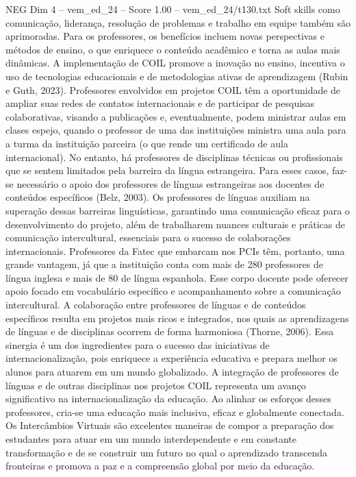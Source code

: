 \begin{textsample}{NEG Dim 4 – vem\_ed\_24 – Score 1.00 – vem\_ed\_24/t130.txt}
Soft skills como comunicação, liderança, resolução de problemas e trabalho em equipe também são aprimoradas.
Para os professores, os benefícios incluem novas perspectivas e métodos de ensino, o que enriquece o conteúdo acadêmico e torna as aulas mais dinâmicas.
A implementação de COIL promove a inovação no ensino, incentiva o uso de tecnologias educacionais e de metodologias ativas de aprendizagem (Rubin e Guth, 2023).
Professores envolvidos em projetos COIL têm a oportunidade de ampliar suas redes de contatos internacionais e de participar de pesquisas colaborativas, visando a publicações e, eventualmente, podem ministrar aulas em clases espejo, quando o professor de uma das instituições ministra uma aula para a turma da instituição parceira (o que rende um certificado de aula internacional).
No entanto, há professores de disciplinas técnicas ou profissionais que se sentem limitados pela barreira da língua estrangeira.
Para esses casos, faz-se necessário o apoio dos professores de línguas estrangeiras aos docentes de conteúdos específicos (Belz, 2003).
Os professores de línguas auxiliam na superação dessas barreiras linguísticas, garantindo uma comunicação eficaz para o desenvolvimento do projeto, além de trabalharem nuances culturais e práticas de comunicação intercultural, essenciais para o sucesso de colaborações internacionais.
Professores da Fatec que embarcam nos PCIs têm, portanto, uma grande vantagem, já que a instituição conta com mais de 280 professores de língua inglesa e mais de 80 de língua espanhola.
Esse corpo docente pode oferecer apoio focado em vocabulário específico e acompanhamento sobre a comunicação intercultural.
A colaboração entre professores de línguas e de conteúdos específicos resulta em projetos mais ricos e integrados, nos quais as aprendizagens de línguas e de disciplinas ocorrem de forma harmoniosa (Thorne, 2006).
Essa sinergia é um dos ingredientes para o sucesso das iniciativas de internacionalização, pois enriquece a experiência educativa e prepara melhor os alunos para atuarem em um mundo globalizado.
A integração de professores de línguas e de outras disciplinas nos projetos COIL representa um avanço significativo na internacionalização da educação.
Ao alinhar os esforços desses professores, cria-se uma educação mais inclusiva, eficaz e globalmente conectada.
Os Intercâmbios Virtuais são excelentes maneiras de compor a preparação dos estudantes para atuar em um mundo interdependente e em constante transformação e de se construir um futuro no qual o aprendizado transcenda fronteiras e promova a paz e a compreensão global por meio da educação.

\end{textsample}
